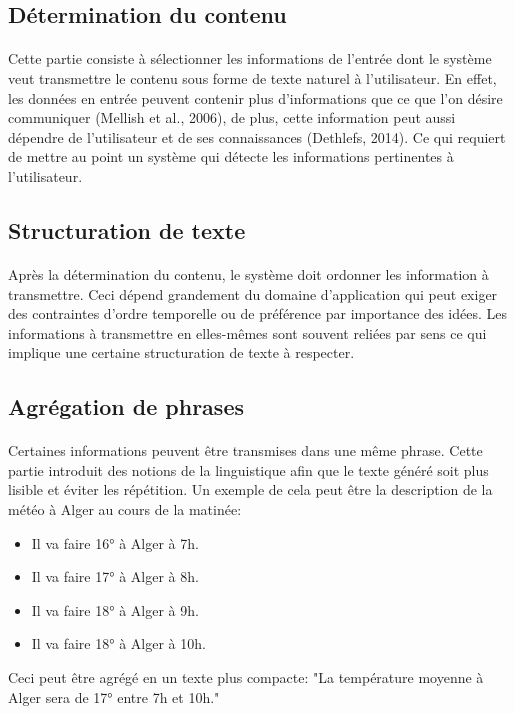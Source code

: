 	\subsection{Détermination du contenu}
	\paragraph{}
	Cette partie consiste à sélectionner les informations de l’entrée dont le système veut transmettre le contenu sous forme de texte naturel à l’utilisateur. En effet, les données en entrée peuvent contenir plus d’informations que ce que l’on désire communiquer (Mellish et al., 2006), de plus, cette information peut aussi dépendre de l’utilisateur et de ses connaissances (Dethlefs, 2014). Ce qui requiert de mettre au point un système qui détecte les informations pertinentes à l’utilisateur.
	\subsection{Structuration de texte}
	\paragraph{}
	Après la détermination du contenu, le système doit ordonner les information à transmettre. Ceci dépend grandement du domaine d’application qui peut exiger des contraintes d’ordre temporelle ou de préférence par importance des idées. Les informations à transmettre en elles-mêmes sont souvent reliées par sens ce qui implique une certaine structuration de texte à respecter.
	\subsection{Agrégation de phrases}
	\paragraph{}
	Certaines informations peuvent être transmises dans une même phrase. Cette partie introduit des notions de la linguistique afin que le texte généré soit plus lisible et éviter les répétition. Un exemple de cela peut être la description de la météo à Alger au cours de la matinée:
	\begin{itemize}
		\item Il va faire 16° à Alger à 7h.
		\item Il va faire 17° à Alger à 8h.
		\item Il va faire 18° à Alger à 9h.
		\item Il va faire 18° à Alger à 10h.
	\end{itemize}
	Ceci peut être agrégé en un texte plus compacte: "La température moyenne à Alger sera de 17° entre 7h et 10h."
	
